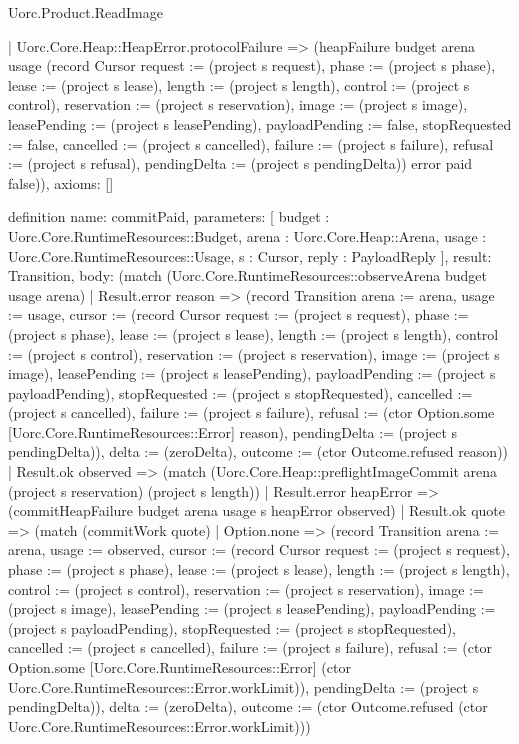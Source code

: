 \begin{lexlean}{Uorc.Product.ReadImage}
\begin{semanticmodule}
{    | Uorc.Core.Heap::HeapError.protocolFailure => (heapFailure budget arena usage (record Cursor {request := (project s request), phase := (project s phase), lease := (project s lease), length := (project s length), control := (project s control), reservation := (project s reservation), image := (project s image), leasePending := (project s leasePending), payloadPending := false, stopRequested := false, cancelled := (project s cancelled), failure := (project s failure), refusal := (project s refusal), pendingDelta := (project s pendingDelta)}) error paid false)),
  axioms: []
}

definition{
  name: commitPaid,
  parameters: [
    budget : Uorc.Core.RuntimeResources::Budget,
    arena : Uorc.Core.Heap::Arena,
    usage : Uorc.Core.RuntimeResources::Usage,
    s : Cursor,
    reply : PayloadReply
  ],
  result: Transition,
  body: (match (Uorc.Core.RuntimeResources::observeArena budget usage arena)
    | Result.error reason => (record Transition {arena := arena, usage := usage, cursor := (record Cursor {request := (project s request), phase := (project s phase), lease := (project s lease), length := (project s length), control := (project s control), reservation := (project s reservation), image := (project s image), leasePending := (project s leasePending), payloadPending := (project s payloadPending), stopRequested := (project s stopRequested), cancelled := (project s cancelled), failure := (project s failure), refusal := (ctor Option.some [Uorc.Core.RuntimeResources::Error] reason), pendingDelta := (project s pendingDelta)}), delta := (zeroDelta), outcome := (ctor Outcome.refused reason)})
    | Result.ok observed => (match (Uorc.Core.Heap::preflightImageCommit arena (project s reservation) (project s length))
      | Result.error heapError => (commitHeapFailure budget arena usage s heapError observed)
      | Result.ok quote => (match (commitWork quote)
        | Option.none => (record Transition {arena := arena, usage := observed, cursor := (record Cursor {request := (project s request), phase := (project s phase), lease := (project s lease), length := (project s length), control := (project s control), reservation := (project s reservation), image := (project s image), leasePending := (project s leasePending), payloadPending := (project s payloadPending), stopRequested := (project s stopRequested), cancelled := (project s cancelled), failure := (project s failure), refusal := (ctor Option.some [Uorc.Core.RuntimeResources::Error] (ctor Uorc.Core.RuntimeResources::Error.workLimit)), pendingDelta := (project s pendingDelta)}), delta := (zeroDelta), outcome := (ctor Outcome.refused (ctor Uorc.Core.RuntimeResources::Error.workLimit))})
}
\end{semanticmodule}
\end{lexlean}
